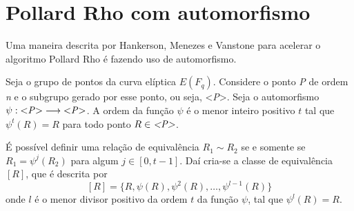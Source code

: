 %
%
\section{Pollard Rho com automorfismo}

Uma maneira descrita por Hankerson, Menezes e Vanstone para acelerar o algoritmo Pollard Rho é fazendo uso de automorfismo.\cite{Guide}

Seja o grupo de pontos da curva elíptica $E(F_q)$. Considere o ponto \textit{P} de ordem \textit{n} e o subgrupo gerado por esse ponto, ou seja, <\textit{P}>. Seja o automorfismo $\psi: \mbox{<\textit{P}>}\longrightarrow \mbox{<\textit{P}>}$. A ordem da função $\psi$ é o menor inteiro positivo $t$ tal que $\psi^t(R) = R$ para todo ponto $R \in \mbox{\textit{<P>}}$.

É possível definir uma relação de equivalência $R_1 \sim R_2$ se e somente se $R_1 = \psi^j(R_2)$ para algum $j \in [0, t - 1]$. Daí cria-se a classe de equivalência $[R]$, que é descrita por
$$
[R] = \{R, \psi(R), \psi^2(R), \dots, \psi^{l-1}(R)\}
$$
onde $l$ é o menor divisor positivo da ordem $t$ da função $\psi$, tal que $\psi^l(R) = R$.
